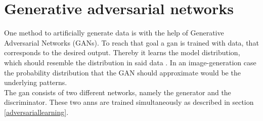 \clearpage
\section{Generative adversarial networks}\label{gans_allg}
One method to artificially generate data is with the help of Generative Adversarial Networks (GANs). To reach that goal a \acs{gan} is trained with data, that corresponds to the desired output.
Thereby it learns the model distribution, which should resemble the distribution in said data \cite{Goodfellow2020}.
In an image-generation case the probability distribution that the GAN should approximate would be the underlying patterns.\\
The \acs{gan} consists of two different networks, namely the generator and the discriminator.
These two \acsp{ann} are trained simultaneously as described in section \ref{adversariallearning}.


